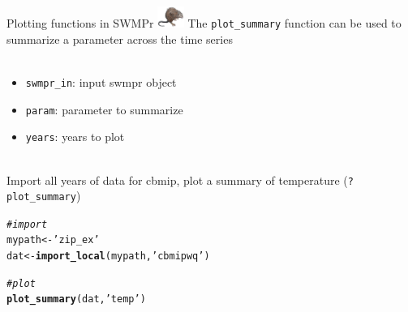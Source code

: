 \documentclass[xcolor=dvipsnames,serif]{beamer}\usepackage[]{graphicx}\usepackage[]{color}
\makeatletter
\newcommand{\hlstr}[1]{\textcolor[rgb]{0.192,0.494,0.8}{#1}}%
\newcommand{\hlcom}[1]{\textcolor[rgb]{0.678,0.584,0.686}{\textit{#1}}}%
\newcommand{\hlstd}[1]{\textcolor[rgb]{0.345,0.345,0.345}{#1}}%
\newcommand{\hlkwb}[1]{\textcolor[rgb]{0.69,0.353,0.396}{#1}}%
\newcommand{\hlkwd}[1]{\textcolor[rgb]{0.737,0.353,0.396}{\textbf{#1}}}%
\newenvironment{kframe}{%
 \def\at@end@of@kframe{}%
 \ifinner\ifhmode%
  \def\at@end@of@kframe{\end{minipage}}%
  \begin{minipage}{\columnwidth}%
 \fi\fi%
 \def\FrameCommand##1{\hskip\@totalleftmargin \hskip-\fboxsep
 \colorbox{shadecolor}{##1}\hskip-\fboxsep
     \hskip-\linewidth \hskip-\@totalleftmargin \hskip\columnwidth}%
 \MakeFramed {\advance\hsize-\width
   \@totalleftmargin\z@ \linewidth\hsize
   \@setminipage}}%
 {\par\unskip\endMakeFramed%
 \at@end@of@kframe}
\newenvironment{knitrout}{}{} %
\makeatother
\begin{document}
\begin{frame}[fragile, t]{Plotting functions in SWMPr \includegraphics[width = 0.065\textwidth]{imgs/swmprat.png}}
The \texttt{plot_summary} function can be used to summarize a parameter across the time series\\~\\
\begin{itemize}
\item \texttt{swmpr\_in}: input swmpr object
\item \texttt{param}: parameter to summarize
\item \texttt{years}: years to plot\\~\\
\end{itemize}
Import all years of data for cbmip, plot a summary of temperature (\texttt{?plot\_summary})
\begin{knitrout}\scriptsize
{}\color{fgcolor}\begin{kframe}
\begin{alltt}
\hlcom{# import}
\hlstd{mypath} \hlkwb{<-} \hlstr{'zip_ex'}
\hlstd{dat} \hlkwb{<-} \hlkwd{import_local}\hlstd{(mypath,} \hlstr{'cbmipwq'}\hlstd{)}

\hlcom{# plot}
\hlkwd{plot_summary}\hlstd{(dat,} \hlstr{'temp'}\hlstd{)}
\end{alltt}
\end{kframe}
\end{knitrout}
\end{frame}
\end{document}
